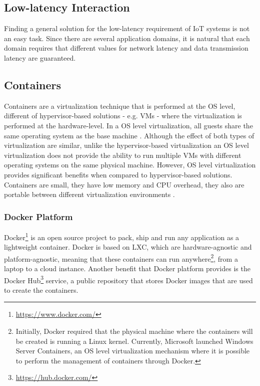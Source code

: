 \subsection{Low-latency Interaction}
\label{sub:low_latency_interaction}
Finding a general solution for the low-latency requirement of \gls{IoT} systems is not an easy task.
Since there are several application domains, it is natural that each domain requires that different
values for network latency and data transmission latency are guaranteed.

\subsection{Containers}
\label{sub:containers}
Containers are a virtualization technique that is performed at the \gls{OS} level, different of
hypervisor-based solutions - e.g. \glspl{VM} - where the virtualization is performed at the hardware-level.
In a \gls{OS} level virtualization, all guests share the same operating system as the base machine \cite{matthews2007quantifying}.
Although the effect of both types of virtualization are similar, unlike the hypervisor-based virtualization
an \gls{OS} level virtualization does not provide the ability to run multiple \glspl{VM} with different
operating systems on the same physical machine. However, \gls{OS} level virtualization provides significant
benefits when compared to hypervisor-based solutions. Containers are small, they have low memory and
\gls{CPU} overhead, they also are portable between different virtualization environments \cite{soltesz2007container}.\\

\subsubsection{Docker Platform}
\label{subs:docker_platform}
Docker\footnote{\url{https://www.docker.com/}} is an open source project to pack, ship and run any application as
a lightweight container. Docker is based on \gls{LXC}, which are hardware-agnostic and platform-agnostic,
meaning that these containers can run anywhere\footnote{Initially, Docker required that the physical
machine where the containers will be created is running a Linux kernel. Currently, Microsoft
launched Windows Server Containers, an \gls{OS} level virtualization mechanism where it is possible to
perform the management of containers through Docker.}, from a laptop to a cloud instance. Another
benefit that Docker platform provides is the Docker Hub\footnote{\url{https://hub.docker.com/}} service,
a public repository that stores Docker images that are used to create the containers.

